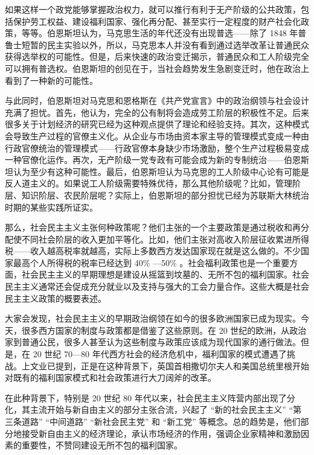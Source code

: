 如果这样一个政党能够掌握政治权力，就可以推行有利于无产阶级的公共政策，包括保护劳工权益、建设福利国家、强化再分配、甚至实行一定程度的财产社会化政策，等等。伯恩斯坦认为，马克思生活的年代还没有出现普选——除了 1848 年普鲁士短暂的民主实验以外，所以，马克思本人并没有看到通过选举改革让普通民众获得选举权的可能性。但是，后来快速的政治变迁揭示，普通民众和工人阶级完全可以拥有普选权。伯恩斯坦的创见在于，当社会趋势发生急剧变迁时，他在政治上看到了一种新的可能性。

与此同时，伯恩斯坦对马克思和恩格斯在《共产党宣言》中的政治纲领与社会设计充满了担忧。首先，他认为，完全的公有制将会造成劳工阶层的积极性不足。后来很多关于计划经济的研究已经为这种观点提供了理论和经验支持。其次，这种模式会导致生产过程的官僚主义化。从企业与市场由资本家主导的管理模式变成一种由行政官僚统治的管理模式——行政官僚本身缺少市场激励，整个生产过程极易变成一种官僚化运作。再次，无产阶级一党专政有可能会成为新的专制统治——伯恩斯坦认为至少有这种可能性。最后，伯恩斯坦认为马克思的工人阶级中心论有可能是反人道主义的。如果说工人阶级需要特殊优待，那么其他阶级呢？比如，管理阶层、知识阶层、农民阶层呢？实际上，伯恩斯坦的部分担忧已经为苏联斯大林统治时期的某些实践所证实。

那么，社会民主主义主张何种政策呢？他们主张的一个主要政策是通过税收和再分配使不同社会阶层的收入更加平等化。比如，他们主张对高收入阶层征收累进所得税——收入越高税率就越高，实际上多数西方发达国家现在就是这么做的。不少国家最高个人所得税的税率已经达到 40\% —50\% 。社会福利政策也是一个重要方面，社会民主主义的早期理想是建设从摇篮到坟墓的、无所不包的福利国家。社会民主主义通常还会促成充分就业以及支持与强大的工会力量合作。这些大概是社会民主主义政策的概要表述。

大家会发现，社会民主主义的早期政治纲领在如今的很多欧洲国家已成为现实。今天，很多西方国家的制度与政策都是借鉴了这些原则。在 20 世纪的欧洲，从政治家到普通公民，很多人甚至认为这些制度与政策应该成为现代国家的通行做法。但是，在 20 世纪 70—80 年代西方社会的经济危机中，福利国家的模式遭遇了挑战。上文业已提到，正是在这种背景下，英国首相撒切尔夫人和美国总统里根开始对既有的福利国家模式和社会政策进行大刀阔斧的改革。

在此种背景下，特别是 20 世纪 80 年代以来，社会民主主义阵营内部出现了分化，其主流开始与新自由主义的部分主张合流，兴起了 “新的社会民主主义”  “第三条道路”  “中间道路”  “新社会民主党” 和 “新工党” 等概念。总的趋势是，他们部分地接受新自由主义的经济理论，承认市场经济的作用，强调企业家精神和激励因素的重要性，不赞同建设无所不包的福利国家。

